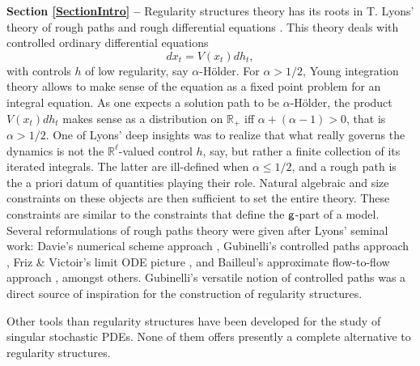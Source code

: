 \documentclass[10pt, reqno]{amsart}
\numberwithin{subsection}{section}
\numberwithin{subsubsection}{subsection}
\numberwithin{equation}{section} %
\theoremstyle{mystyle}
\theoremstyle{mystyle2}
\theoremstyle{mystyle3}
\newcommand{\ssk}{\smallskip}
\newcommand\bbR{\mathbb{R}}
\begin{document}
\textbf{\textsf{Section \ref{SectionIntro} -- }} Regularity structures theory has its roots in T. Lyons' theory of rough paths and rough differential equations \cite{Lyons98}. This theory deals with controlled ordinary differential equations
$$
dx_t = V(x_t)dh_t,
$$
with controls $h$ of low regularity, say $\alpha$-H\"older. For $\alpha>1/2$, Young integration theory allows to make sense of the equation as a fixed point problem for an integral equation. As one expects a solution path to be $\alpha$-H\"older, the product $V(x_t)dh_t$ makes sense as a distribution on $\bbR_+$ iff $\alpha+(\alpha-1)>0$, that is $\alpha>1/2$. One of Lyons' deep insights was to realize that what really governs the dynamics is not the $\bbR^\ell$-valued control $h$, say, but rather a finite 
collection of its iterated integrals. The latter are ill-defined when $\alpha\leq 1/2$, and a rough path is the a priori datum of quantities playing their role. Natural algebraic and size constraints on these objects are then sufficient to set the entire theory. These constraints are similar 
to the constraints that define the $\sf g$-part of a model. Several reformulations of rough paths theory were given after Lyons' seminal work: Davie's numerical scheme approach \cite{Davie}, Gubinelli's controlled paths 
approach \cite{GubinelliControlled, GubinelliBranched}, Friz \& Victoir's 
limit ODE picture \cite{FrizVictoir}, and Bailleul's approximate flow-to-flow approach \cite{BailleulRMI}, amongst others. Gubinelli's versatile notion of controlled paths was a direct source of inspiration for the construction of regularity structures.   

\medskip

Other tools than regularity structures have been developed for the study of singular stochastic PDEs. None of them offers presently a complete alternative to regularity structures. 

\ssk
\end{document}
